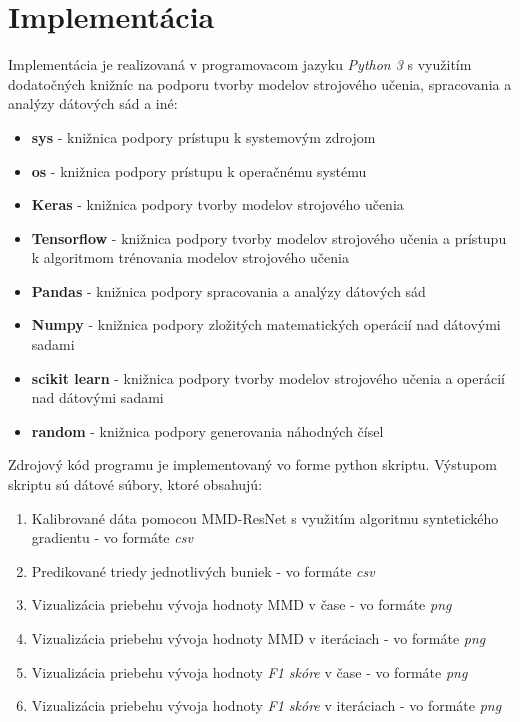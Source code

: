 \chapter{Implementácia}  %
\label{implementacia}

Implementácia je realizovaná v programovacom jazyku \textit{Python 3} s využitím dodatočných knižníc na podporu tvorby modelov strojového učenia, spracovania a analýzy dátových sád a iné:
\begin{itemize}
    \item \textbf{sys} - knižnica podpory prístupu k systemovým zdrojom
    \item \textbf{os} -  knižnica podpory prístupu k operačnému systému
    \item \textbf{Keras} - knižnica podpory tvorby modelov strojového učenia
    \item \textbf{Tensorflow} - knižnica podpory tvorby modelov strojového učenia a prístupu k algoritmom trénovania modelov strojového učenia
    \item \textbf{Pandas} - knižnica podpory spracovania a analýzy dátových sád
    \item \textbf{Numpy} - knižnica podpory zložitých matematických operácií nad dátovými sadami
    \item \textbf{scikit learn} - knižnica podpory tvorby modelov strojového učenia a operácií nad dátovými sadami
    \item \textbf{random} - knižnica podpory generovania náhodných čísel
\end{itemize}

Zdrojový kód programu je implementovaný vo forme python skriptu. Výstupom skriptu sú dátové súbory, ktoré obsahujú:
\begin{enumerate}
    \item Kalibrované dáta pomocou MMD-ResNet s využitím algoritmu syntetického gradientu - vo formáte \textit{csv}
    \item Predikované triedy jednotlivých buniek - vo formáte \textit{csv}
    \item Vizualizácia priebehu vývoja hodnoty MMD v čase - vo formáte \textit{png}
    \item Vizualizácia priebehu vývoja hodnoty MMD v iteráciach - vo formáte \textit{png}
    \item Vizualizácia priebehu vývoja hodnoty \textit{F1 skóre} v čase - vo formáte \textit{png}
    \item Vizualizácia priebehu vývoja hodnoty \textit{F1 skóre} v iteráciach - vo formáte \textit{png}
\end{enumerate}


